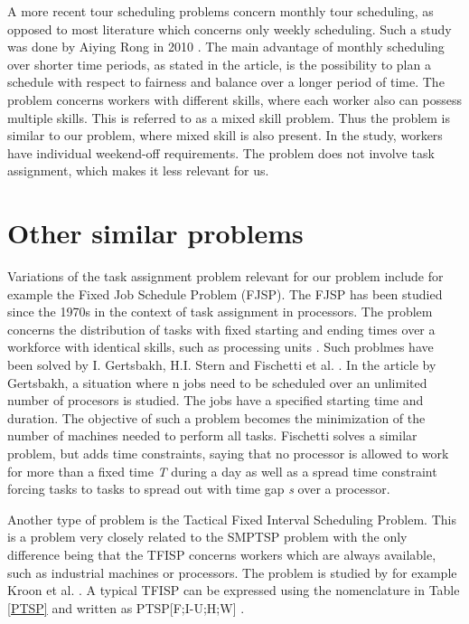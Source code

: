 A more recent tour scheduling problems concern monthly tour scheduling, as opposed to most literature which concerns only weekly scheduling. Such a study was done by Aiying Rong in 2010 \cite{rong_2010}. The main advantage of monthly scheduling over shorter time periods, as stated in the article, is the possibility to plan a schedule with respect to fairness and balance over a longer period of time. The problem concerns workers with different skills, where each worker also can possess multiple skills. This is referred to as a mixed skill problem. Thus the problem is similar to our problem, where mixed skill is also present. In the study, workers have individual weekend-off requirements. The problem does not involve task assignment, which makes it less relevant for us.



\section{Other similar problems}\label{other}

Variations of the task assignment problem relevant for our problem include for example the Fixed Job Schedule Problem (FJSP). The FJSP has been studied since the 1970s in the context of task assignment in processors. The problem concerns the distribution of tasks with fixed starting and ending times over a workforce with identical skills, such as processing units \cite{krishnamoorthy_2011}. Such problmes have been solved by I. Gertsbakh, H.I. Stern \cite{Gertsbakh_1977} and Fischetti et al. \cite{fischetti_1992}. In the article by Gertsbakh, a situation where n jobs need to be scheduled over an unlimited number of procesors is studied. The jobs have a specified starting time and duration. The objective of such a problem becomes the minimization of the number of machines needed to perform all tasks. Fischetti solves a similar problem, but adds time constraints, saying that no processor is allowed to work for more than a fixed time \textit{T} during a day as well as a spread time constraint forcing tasks to tasks to spread out with time gap \textit{s} over a processor.	

Another type of problem is the Tactical Fixed Interval Scheduling Problem. This is a problem very closely related to the SMPTSP problem with the only difference being that the TFISP concerns workers which are always available, such as industrial machines or processors. The problem is studied by for example Kroon et al. \cite{kroon_1997}. A typical TFISP can be expressed using the nomenclature in Table \ref{PTSP} and written as PTSP[F;I-U;H;W] \cite{krishnamoorthy_2001}.

